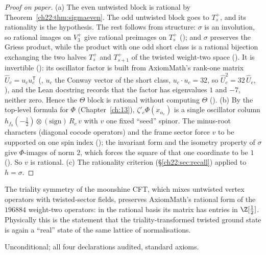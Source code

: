 \begin{proof}[Proof on paper]
(a) The even untwisted block is rational by Theorem~\ref{ch22:thm:sigmaeven}.  The odd untwisted block goes to $T_s^+$, and
its rationality is the hypothesis.  The rest follows from structure: $\sigma$ is an involution, so rational images on
$V_3^+$ give rational preimages on $T_s^+$ (); and $\sigma$ preserves the Griess product, while
the product with one odd short class is a rational bijection exchanging the two halves $T_s^+$ and $T_{s+1}^+$ of the
twisted weight-two space ().  It is invertible (): its oscillator factor is built from
AxiomMath's rank-one matrix $\widehat U_c=u_cu_c^{\mathsf T}$ (, $u_c$ the Conway vector of the short class, $u_c\cdot u_c=32$,
so $\widehat U_c^2=32\,\widehat U_c$, ), and the Lean docstring records that the factor has eigenvalues $1$ and $-7$, neither
zero.  Hence the $\Theta$ block is rational without computing $\Theta$ ().
(b) By the top-level formula for $\Phi$ (Chapter~\ref{ch:13}), $\zeta'_c\Phi(x_{\alpha_c})$ is a single oscillator column
$h_{f_b}(-\tfrac12)\otimes(\text{sign})\,R_c\,v$ with $v$ one fixed ``seed'' spinor.  The minus-root characters (diagonal
cocode operators) and the frame sector force $v$ to be supported on one spin index
(); the invariant form and the isometry property of $\sigma$ give $\Phi$-images of norm
$2$, which forces the square of that one coordinate to be $1$ ().  So $v$ is rational.
(c) The rationality criterion  (\S\ref{ch22:sec:recall}) applied to $h=\sigma$.
\end{proof}
\begin{physics}
The triality symmetry of the moonshine CFT, which mixes untwisted vertex operators with twisted-sector fields, preserves
AxiomMath's rational form of the $196884$ weight-two operators: in the rational basis its matrix has entries in
$\Z[\tfrac12]$.  Physically this is the statement that the triality-transformed twisted ground state is again a ``real''
state of the same lattice of normalisations.
\end{physics}
\begin{status}Unconditional; all four declarations audited, standard axioms.\end{status}

